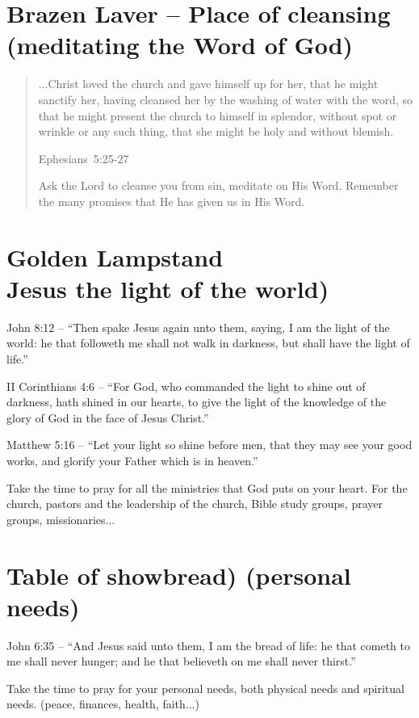 \section{Brazen Laver – Place of cleansing (meditating the Word of God)}



\begin{quote}
...Christ loved the church and gave himself up for her, that he might sanctify her, having cleansed her by the washing of water with the word, so that he might present the church to himself in splendor, without spot or wrinkle or any such thing, that she might be holy and without blemish.

\raggedleft\small Ephesians~5:25-27

Ask the Lord to cleanse you from sin, meditate on His Word. Remember the many promises that He has given us in His Word.
\end{quote}



\section{Golden Lampstand\\Jesus the light of the world)}

John 8:12 – “Then spake Jesus again unto them, saying, I am the light of the world: he that followeth me shall not walk in darkness, but shall have the light of life.”

II Corinthians 4:6 – “For God, who commanded the light to shine out of darkness, hath shined in our hearts, to give the light of the knowledge of the glory of God in the face of Jesus Christ.”

Matthew 5:16 – “Let your light so shine before men, that they may see your good works, and glorify your Father which is in heaven.”

Take the time to pray for all the ministries that God puts on your heart. For the church, pastors and the leadership of the church, Bible study groups, prayer groups, missionaries... 
\section{Table of showbread) (personal needs)}

John 6:35 – “And Jesus said unto them, I am the bread of life: he that cometh to me shall never hunger; and he that believeth on me shall never thirst.”

Take the time to pray for your personal needs, both physical needs and spiritual needs. (peace, finances, health, faith...) 


